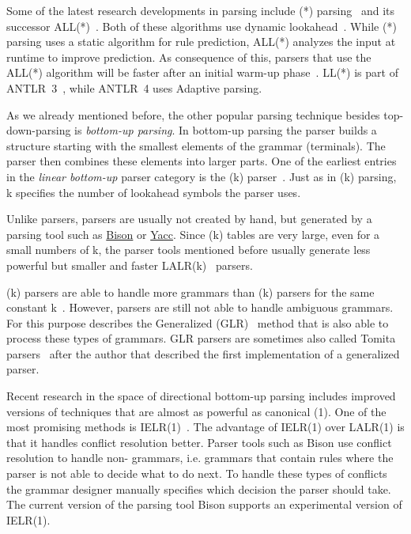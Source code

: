 Some of the latest research developments in  parsing include (*) parsing~\cite{parr2011ll} and its successor \gls{ALL(*)}~\cite{parr2014adaptive}. Both of these algorithms use dynamic lookahead~\cite[p. 1]{parr2011ll}. While (*) parsing uses a static algorithm for rule prediction, ALL(*) analyzes the input at runtime to improve prediction. As consequence of this, parsers that use the \gls{ALL(*)} algorithm will be faster after an initial warm-up phase~\cite[p. 3]{parr2014adaptive}. LL(*) is part of \gls{ANTLR}~3~\cite[p. 3]{parr2014adaptive}, while \gls{ANTLR}~4 uses Adaptive  parsing.

As we already mentioned before, the other popular parsing technique besides top-down-parsing is \emph{bottom-up parsing}. In bottom-up parsing the parser builds a structure starting with the smallest elements of the grammar (terminals). The parser then combines these elements into larger parts. One of the earliest entries in the \emph{linear bottom-up} parser category is the (k) parser~\cite{knuth1965translation}. Just as in (k) parsing, k specifies the number of lookahead symbols the parser uses.

\begin{sloppypar}
Unlike  parsers,  parsers are usually not created by hand, but generated by a parsing tool such as \href{https://www.gnu.org/software/bison}{Bison} or \href{http://dinosaur.compilertools.net/yacc}{Yacc}. Since (k) tables are very large, even for a small numbers of k, the parser tools mentioned before usually generate less powerful but smaller and faster LALR(k)~\cite{deremer1969practical} parsers.
\end{sloppypar}

(k) parsers are able to handle more grammars than (k) parsers for the same constant k~\cite[section “Lookahead”]{haberman2013ll}. However,  parsers are still not able to handle ambiguous grammars. For this purpose \citeauthor{lang1974deterministic} describes the Generalized  (GLR)~\cite{lang1974deterministic} method that is also able to process these types of grammars. GLR parsers are sometimes also called Tomita parsers~\cite{tomita1985efficient} after the author that described the first implementation of a generalized  parser.

Recent research in the space of directional bottom-up parsing includes improved versions of techniques that are almost as powerful as canonical (1). One of the most promising methods is IELR(1)~\cite{denny2008ielr}. The advantage of IELR(1) over LALR(1) is that it handles conflict resolution better. Parser tools such as Bison use conflict resolution to handle non- grammars, i.e. grammars that contain rules where the parser is not able to decide what to do next. To handle these types of conflicts the grammar designer manually specifies which decision the parser should take. The current version of the parsing tool Bison supports an experimental version of IELR(1).

